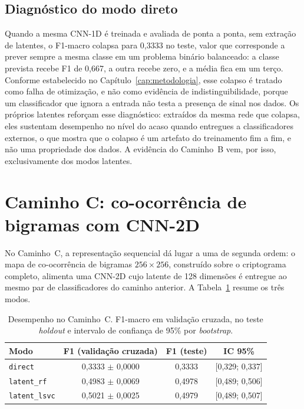 \subsection{Diagnóstico do modo direto}
\label{sec:res-b-direct}

Quando a mesma CNN-1D é treinada e avaliada de ponta a ponta, sem extração de latentes, o F1-macro colapsa para 0,3333 no teste, valor que corresponde a prever sempre a mesma classe em um problema binário balanceado: a classe prevista recebe F1 de 0,667, a outra recebe zero, e a média fica em um terço. Conforme estabelecido no Capítulo~\ref{cap:metodologia}, esse colapso é tratado como falha de otimização, e não como evidência de indistinguibilidade, porque um classificador que ignora a entrada não testa a presença de sinal nos dados. Os próprios latentes reforçam esse diagnóstico: extraídos da mesma rede que colapsa, eles sustentam desempenho no nível do acaso quando entregues a classificadores externos, o que mostra que o colapso é um artefato do treinamento fim a fim, e não uma propriedade dos dados. A evidência do Caminho~B vem, por isso, exclusivamente dos modos latentes.

\section{Caminho C: co-ocorrência de bigramas com CNN-2D}
\label{sec:res-caminho-c}

No Caminho~C, a representação sequencial dá lugar a uma de segunda ordem: o mapa de co-ocorrência de bigramas $256 \times 256$, construído sobre o criptograma completo, alimenta uma CNN-2D cujo latente de 128 dimensões é entregue ao mesmo par de classificadores do caminho anterior. A Tabela~\ref{tab:res-c} resume os três modos.

\begin{table}[htb]
\centering
\caption{Desempenho no Caminho~C. F1-macro em validação cruzada, no teste \textit{holdout} e intervalo de confiança de 95\% por \textit{bootstrap}.}
\label{tab:res-c}
\begin{tabular}{lccc}
\toprule
Modo & F1 (validação cruzada) & F1 (teste) & IC 95\% \\
\midrule
\texttt{direct}       & 0,3333 $\pm$ 0,0000 & 0,3333 & [0,329; 0,337] \\
\texttt{latent\_rf}   & 0,4983 $\pm$ 0,0069 & 0,4978 & [0,489; 0,506] \\
\texttt{latent\_lsvc} & 0,5021 $\pm$ 0,0025 & 0,4979 & [0,489; 0,507] \\
\bottomrule
\end{tabular}
\end{table}


